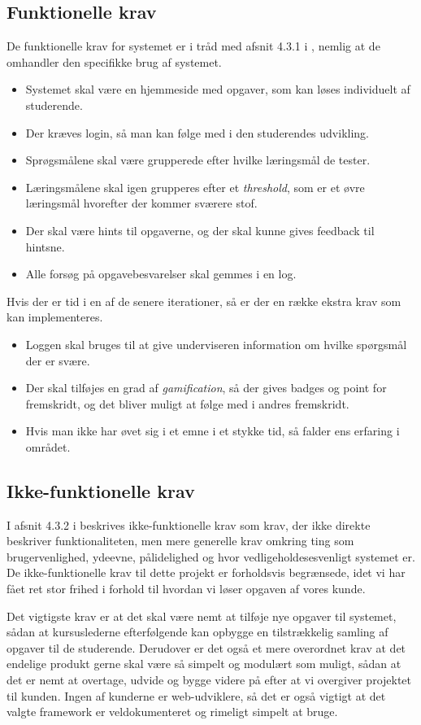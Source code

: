 \documentclass[12pt]{article}
\begin{document}
\subsection{Funktionelle krav}
De funktionelle krav for systemet er i tråd med afsnit 4.3.1 i \cite{OOSE}, nemlig at de omhandler den specifikke brug af systemet.
\begin{itemize}
    \item Systemet skal være en hjemmeside med opgaver, som kan løses individuelt af studerende.
    \item Der kræves login, så man kan følge med i den studerendes udvikling.
    \item Sprøgsmålene skal være grupperede efter hvilke læringsmål de tester.
    \item Læringsmålene skal igen grupperes efter et \emph{threshold}, som er et øvre læringsmål hvorefter der kommer sværere stof.
    \item Der skal være hints til opgaverne, og der skal kunne gives feedback til hintsne.
    \item Alle forsøg på opgavebesvarelser skal gemmes i en log.
\end{itemize}
Hvis der er tid i en af de senere iterationer, så er der en række ekstra krav som kan implementeres.
\begin{itemize}
    \item Loggen skal bruges til at give underviseren information om hvilke spørgsmål der er svære.
    \item Der skal tilføjes en grad af \emph{gamification}, så der gives badges og point for fremskridt, og det bliver muligt at følge med i andres fremskridt.
    \item Hvis man ikke har øvet sig i et emne i et stykke tid, så falder ens erfaring i området.
\end{itemize}

\subsection{Ikke-funktionelle krav}
I afsnit 4.3.2 i \cite{OOSE} beskrives ikke-funktionelle krav som krav, der ikke direkte beskriver funktionaliteten, men mere generelle krav omkring ting som brugervenlighed, ydeevne, pålidelighed og hvor vedligeholdesesvenligt systemet er. De ikke-funktionelle krav til dette projekt er forholdsvis begrænsede, idet vi har fået ret stor frihed i forhold til hvordan vi løser opgaven af vores kunde.

Det vigtigste krav er at det skal være nemt at tilføje nye opgaver til systemet, sådan at kursuslederne efterfølgende kan opbygge en tilstrækkelig samling af opgaver til de studerende. Derudover er det også et mere overordnet krav at det endelige produkt gerne skal være så simpelt og modulært som muligt, sådan at det er nemt at overtage, udvide og bygge videre på efter at vi overgiver projektet til kunden. Ingen af kunderne er web-udviklere, så det er også vigtigt at det valgte framework er veldokumenteret og rimeligt simpelt at bruge.
\end{document}
